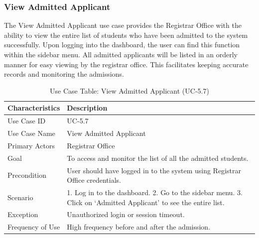 \subsubsection{View Admitted Applicant}
The View Admitted Applicant use case provides the Registrar Office with the ability to view the entire list of students who have been admitted to the system successfully. Upon logging into the dashboard, the user can find this function within the sidebar menu. All admitted applicants will be listed in an orderly manner for easy viewing by the registrar office. This facilitates keeping accurate records and monitoring the admissions.
\begin{table}[H]
    \centering
    \small
    \renewcommand{\arraystretch}{1.4}
    \caption{Use Case Table: View Admitted Applicant (UC-5.7)} %
    \label{tab:view-admitted-applicant-registrar}
    \begin{tabularx}{\textwidth}{|l|X|}
        \hline
        \rowcolor[gray]{0.9} {Characteristics} & {Description} \\ \hline
        Use Case ID & UC-5.7 \\ \hline
        Use Case Name & View Admitted Applicant \\ \hline
        Primary Actors & Registrar Office \\ \hline
        Goal & To access and monitor the list of all the admitted students. \\ \hline
        Precondition & User should have logged in to the system using Registrar Office credentials. \\ \hline
        Scenario & 1. Log in to the dashboard. 2. Go to the sidebar menu. 3. Click on ‘Admitted Applicant’ to see the entire list. \\ \hline
        Exception & Unauthorized login or session timeout. \\ \hline
        Frequency of Use & High frequency before and after the admission. \\ \hline
    \end{tabularx}
\end{table}
\FloatBarrier